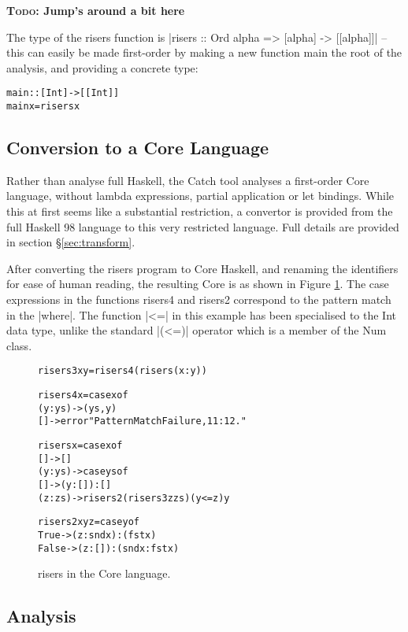 \documentclass[preprint]{sigplanconf}
\newcommand{\C}[1]{\textsf{#1}}
\newcommand{\todo}[1]{\textbf{\textsc{Todo:} #1}}
\newenvironment{code}{\begin{alltt}\small}{\end{alltt}}
\begin{document}
\todo{Jump's around a bit here}

The type of the \C{risers} function is |risers :: Ord alpha => [alpha] -> [[alpha]]| -- this can easily be made first-order by making a new function \C{main} the root of the analysis, and providing a concrete type:

\begin{code}
main :: [Int] -> [[Int]]
main x = risers x
\end{code}

\subsection{Conversion to a Core Language}

Rather than analyse full Haskell, the Catch tool analyses a first-order Core language, without lambda expressions, partial application or let bindings. While this at first seems like a substantial restriction, a convertor is provided from the full Haskell 98 language to this very restricted language. Full details are provided in section \S\ref{sec:transform}.

After converting the \C{risers} program to Core Haskell, and renaming the identifiers for ease of human reading, the resulting Core is as shown in Figure \ref{fig:risers_core}. The case expressions in the functions \C{risers4} and \C{risers2} correspond to the pattern match in the |where|. The function |<=| in this example has been specialised to the Int data type, unlike the standard |(<=)| operator which is a member of the \C{Num} class.

\begin{figure}
\begin{code}
risers3 x y = risers4 (risers (x : y))

risers4 x = case x of
    (y:ys) -> (ys, y)
    [] -> error "Pattern Match Failure, 11:12."

risers x = case x of
    [] -> []
    (y:ys) ->  case ys of
         [] -> (y : []) : []
         (z:zs) -> risers2 (risers3 z zs) (y <= z) y

risers2 x y z =  case y of
    True -> (z : snd x) : (fst x)
    False -> (z : []) : (snd x : fst x)
\end{code}
\caption{\C{risers} in the Core language.}
\label{fig:risers_core}
\end{figure}

\subsection{Analysis}
\end{document}
